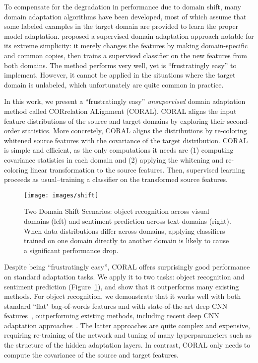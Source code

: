 \documentclass[letterpaper]{article}
\begin{document}
To compensate for the degradation in performance due to domain shift, 
many domain adaptation algorithms have been developed, most of which assume that some labeled examples in the target domain are provided to learn the proper model adaptation. \citeauthor{daume}  
proposed a supervised domain adaptation approach notable for its extreme simplicity: it merely changes the features by making domain-specific and common copies, then trains a supervised classifier on the new features from both domains. The method performs very well, yet is ``frustratingly easy'' to implement. However, it cannot be applied in the situations where the target domain is unlabeled, which unfortunately are quite common in practice.

In this work, we present a ``frustratingly easy'' \emph{unsupervised} domain adaptation method called CORrelation ALignment (CORAL). CORAL aligns the input feature distributions of the source and target domains by exploring their second-order statistics. More concretely, CORAL aligns the distributions by re-coloring whitened source features with the covariance of the target distribution. CORAL is simple and  efficient, as the only computations it needs are (1) computing covariance statistics in each domain and (2) applying the whitening and re-coloring linear transformation to the source features. Then, supervised learning proceeds as usual--training a classifier on the transformed source features. 

\begin{figure}[t]
\centering
\texttt{[image: images/shift]}
\vspace{-0.2in}
\caption{\small Two Domain Shift Scenarios: object recognition across visual domains (left) and sentiment prediction across text domains (right). When data distributions differ across domains, applying classifiers trained on one domain directly to another domain is likely to cause a significant performance drop. }
\label{fig:shift}
\vspace{-0.1in}
\end{figure}

Despite being ``frustratingly easy'', CORAL offers surprisingly good performance on standard adaptation tasks. We apply it to two tasks: object recognition and sentiment prediction (Figure~\ref{fig:shift}), and show that it outperforms many existing methods. For object recognition, we demonstrate that it works well with both standard ``flat" bag-of-words features and with state-of-the-art deep CNN features~\cite{alexnet}, 
outperforming existing methods, including recent deep CNN adaptation approaches~\cite{tzeng_arxiv15,reversegrad,dan_long15}.
The latter approaches are quite complex and expensive, requiring re-training of the network and tuning of many hyperparameters such as the structure of the hidden adaptation layers. In contrast, CORAL only needs to compute the covariance of the source and target features. 
\end{document}
